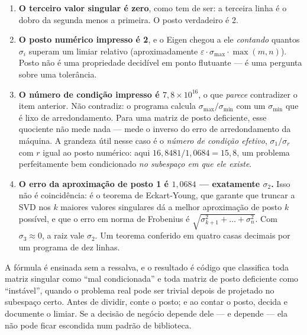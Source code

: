 \begin{enumerate}
  \item \textbf{O terceiro valor singular é zero}, como tem de ser: a terceira
        linha é o dobro da segunda menos a primeira. O posto verdadeiro é 2.
  \item \textbf{O posto numérico impresso é 2}, e o Eigen chegou a ele
        \emph{contando} quantos $\sigma_i$ superam um limiar relativo
        (aproximadamente $\varepsilon \cdot \sigma_{\max} \cdot \max(m,n)$).
        Posto não é uma propriedade decidível em ponto flutuante --- é uma
        pergunta sobre uma tolerância.
  \item \textbf{O número de condição impresso é $7{,}8 \times 10^{16}$}, o que
        \emph{parece} contradizer o item anterior. Não contradiz: o programa
        calcula $\sigma_{\max}/\sigma_{\min}$ com um $\sigma_{\min}$ que é lixo
        de arredondamento. Para uma matriz de posto deficiente, esse quociente
        não mede nada --- mede o inverso do erro de arredondamento da máquina.
        A grandeza útil nesse caso é o \emph{número de condição efetivo},
        $\sigma_1/\sigma_r$ com $r$ igual ao posto numérico: aqui
        $16{,}8481/1{,}0684 = 15{,}8$, um problema perfeitamente bem
        condicionado \emph{no subespaço em que ele existe}.
  \item \textbf{O erro da aproximação de posto 1 é $1{,}0684$ --- exatamente
        $\sigma_2$.} Isso não é coincidência: é o teorema de Eckart-Young, que
        garante que truncar a SVD nos $k$ maiores valores singulares dá a melhor
        aproximação de posto $k$ possível, e que o erro em norma de Frobenius é
        $\sqrt{\sigma_{k+1}^2 + \dots + \sigma_n^2}$. Com $\sigma_3 \approx 0$,
        a raiz vale $\sigma_2$. Um teorema conferido em quatro casas decimais
        por um programa de dez linhas.
\end{enumerate}

\begin{armadilha}
A fórmula é ensinada sem a ressalva, e o resultado é código que classifica toda
matriz singular como ``mal condicionada'' e toda matriz de posto deficiente como
``instável'', quando o problema real pode ser trivial depois de projetado no
subespaço certo. Antes de dividir, conte o posto; e ao contar o posto, decida e
documente o limiar. Se a decisão de negócio depende dele --- e depende --- ela não
pode ficar escondida num padrão de biblioteca.
\end{armadilha}

